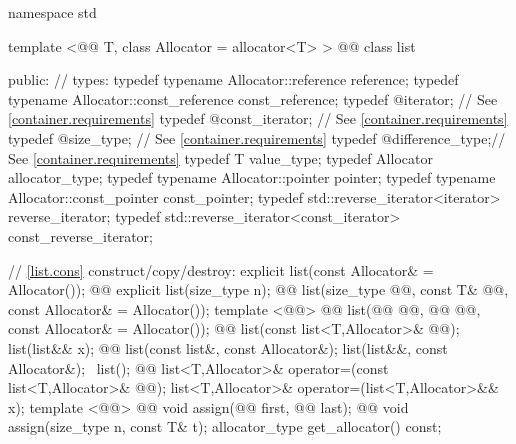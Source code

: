 \documentclass[american,twoside]{book}
\begin{document}
\begin{codeblock}
namespace std {
  template <@@ T, class Allocator = allocator<T> >
  @@
  class list {
  public:
    // types:
    typedef typename Allocator::reference         reference;
    typedef typename Allocator::const_reference   const_reference;
    typedef @\impdef@                iterator;       // See \ref{container.requirements}
    typedef @\impdef@                const_iterator; // See \ref{container.requirements}
    typedef @\impdef@                size_type;      // See \ref{container.requirements}
    typedef @\impdef@                difference_type;// See \ref{container.requirements}
    typedef T                                     value_type;
    typedef Allocator                             allocator_type;
    typedef typename Allocator::pointer           pointer;
    typedef typename Allocator::const_pointer     const_pointer;
    typedef std::reverse_iterator<iterator>       reverse_iterator;
    typedef std::reverse_iterator<const_iterator> const_reverse_iterator;

    // \ref{list.cons} construct/copy/destroy:
    explicit list(const Allocator& = Allocator());
    @@ explicit list(size_type n);
    @@ 
      list(size_type @@, const T& @@, const Allocator& = Allocator());
    template <@@>
      @@
      list(@@ @@, @@ @@, const Allocator& = Allocator());
    @@ list(const list<T,Allocator>& @@);
    list(list&& x);
    @@ list(const list&, const Allocator&);
    list(list&&, const Allocator&);
   ~list();
    @@ list<T,Allocator>& operator=(const list<T,Allocator>& @@);
    list<T,Allocator>& operator=(list<T,Allocator>&& x);
    template <@@>
      @@
      void assign(@@ first, @@ last);
    @@ void assign(size_type n, const T& t);
    allocator_type get_allocator() const;

}}
\end{codeblock}
\end{document}
